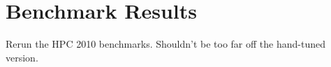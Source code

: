 \chapter{Benchmark Results} \label{chap:benchmarks}

Rerun the HPC 2010 benchmarks.
Shouldn't be too far off the hand-tuned version.
